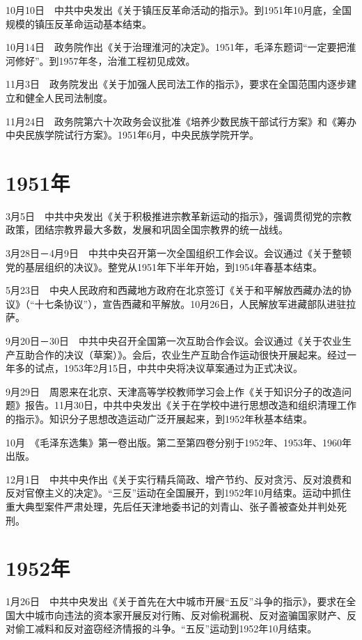 \documentclass[10pt,a4paper,twocolumn]{book}
\begin{document}
10月10日　中共中央发出《关于镇压反革命活动的指示》。到1951年10月底，全国规模的镇压反革命运动基本结束。

10月14日　政务院作出《关于治理淮河的决定》。1951年，毛泽东题词“一定要把淮河修好”。到1957年冬，治淮工程初见成效。

11月3日　政务院发出《关于加强人民司法工作的指示》，要求在全国范围内逐步建立和健全人民司法制度。

11月24日　政务院第六十次政务会议批准《培养少数民族干部试行方案》和《筹办中央民族学院试行方案》。1951年6月，中央民族学院开学。

\section{1951年}

3月5日　中共中央发出《关于积极推进宗教革新运动的指示》，强调贯彻党的宗教政策，团结宗教界最大多数，发展和巩固全国宗教界的统一战线。

3月28日－4月9日　中共中央召开第一次全国组织工作会议。会议通过《关于整顿党的基层组织的决议》。整党从1951年下半年开始，到1954年春基本结束。

5月23日　中央人民政府和西藏地方政府在北京签订《关于和平解放西藏办法的协议》（“十七条协议”），宣告西藏和平解放。10月26日，人民解放军进藏部队进驻拉萨。

9月20日－30日　中共中央召开全国第一次互助合作会议。会议通过《关于农业生产互助合作的决议（草案）》。会后，农业生产互助合作运动很快开展起来。经过一年多的试点，1953年2月15日，中共中央将决议草案通过为正式决议。

9月29日　周恩来在北京、天津高等学校教师学习会上作《关于知识分子的改造问题》报告。11月30日，中共中央发出《关于在学校中进行思想改造和组织清理工作的指示》。知识分子思想改造运动广泛开展起来，到1952年秋基本结束。

10月　《毛泽东选集》第一卷出版。第二至第四卷分别于1952年、1953年、1960年出版。

12月1日　中共中央作出《关于实行精兵简政、增产节约、反对贪污、反对浪费和反对官僚主义的决定》。“三反”运动在全国展开，到1952年10月结束。运动中抓住重大典型案件严肃处理，先后任天津地委书记的刘青山、张子善被查处并判处死刑。

\section{1952年}

1月26日　中共中央发出《关于首先在大中城市开展“五反”斗争的指示》，要求在全国大中城市向违法的资本家开展反对行贿、反对偷税漏税、反对盗骗国家财产、反对偷工减料和反对盗窃经济情报的斗争。“五反”运动到1952年10月结束。
\end{document}
